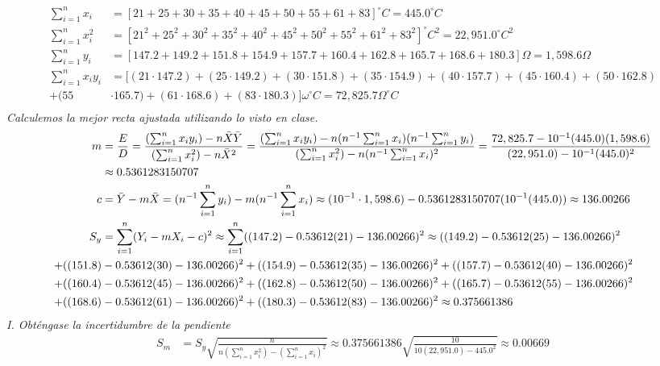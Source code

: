 \documentclass{article}
\begin{document}
\newpage
\begin{align*}
    \sum_{i=1}^n x_i &= [21 + 25 + 30 + 35 + 40 + 45 + 50 + 55 + 61 + 83 ]^{\circ}C = 445.0^{\circ}C \\
    \sum_{i=1}^n x^2_i &= [21^2 + 25^2 + 30^2 + 35^2 + 40^2 + 45^2 + 50^2 + 55^2 + 61^2 + 83^2 ] ^{\circ}C^2 = 22,951.0 ^{\circ}C^2 \\
    \sum_{i=1}^n y_i &= [147.2 + 149.2 + 151.8 + 154.9 + 157.7 + 160.4 + 162.8 + 165.7 + 168.6 + 180.3]\Omega = 1,598.6 \Omega \\
    \sum_{i=1}^n x_iy_i &= [(21 \cdot 147.2) + (25 \cdot 149.2) + (30 \cdot 151.8) + (35 \cdot 154.9) + (40 \cdot 157.7) + (45 \cdot 160.4) + (50 \cdot 162.8) \\ + (55 &\cdot 165.7) + (61 \cdot 168.6) + (83 \cdot 180.3)]\omega^{\circ}C = 72,825.7 \Omega^{\circ}C \\
\end{align*}
\textit{Calculemos la mejor recta ajustada utilizando lo visto en clase.}\\
\begin{align*}
    m &= \frac{E}{D} = \frac{(\sum_{i=1}^n x_iy_i) - n\Bar{X}\Bar{Y}}{(\sum_{i=1}^n x^2_i) - n\Bar{X}^2} = \frac{(\sum_{i=1}^n x_iy_i) - n(n^{-1}\sum_{i=1}^n x_i)(n^{-1}\sum_{i=1}^n y_i)}{(\sum_{i=1}^n x^2_i) - n(n^{-1}\sum_{i=1}^n x_i)^2} = \frac{72,825.7 - 10^{-1}(445.0)(1,598.6)}{(22,951.0)-10^{-1}(445.0)^2}\\
    &\approx 0.5361283150707 \\
    c &= \Bar{Y} - m\Bar{X} = (n^{-1}\sum_{i=1}^n y_i) - m(n^{-1}\sum_{i=1}^n x_i) \approx (10^{-1}\cdot1,598.6) - 0.5361283150707(10^{-1}(445.0)) \approx 136.00266 \\
    S_y &= \sum_{i=1}^n (Y_i-mX_i-c)^2 \approx \sum_{i=1}^n ((147.2)-0.53612(21)-136.00266)^2 \approx ((149.2)-0.53612(25)-136.00266)^2 \\ + ((151.8) &-0.53612(30) -136.00266)^2 + ((154.9)-0.53612(35)-136.00266)^2 + ((157.7)-0.53612(40)-136.00266)^2 \\
    + ((160.4) &-0.53612(45) -136.00266)^2 +((162.8)-0.53612(50)-136.00266)^2 + ((165.7)-0.53612(55)-136.00266)^2 \\
    + ((168.6) &-0.53612(61) -136.00266)^2 + ((180.3)-0.53612(83)-136.00266)^2 \approx 0.375661386
\end{align*}
\textit{I. Obténgase la incertidumbre de la pendiente}
\begin{align*}
    S_m &= S_y \sqrt{\frac{n}{n(\sum_{i=1}^n x^2_i) - (\sum_{i=1}^n x_i)^2}} \approx 0.375661386\sqrt{\frac{10}{10(22,951.0) - 445.0^2}} \approx 0.00669
\end{align*}
\end{document}
